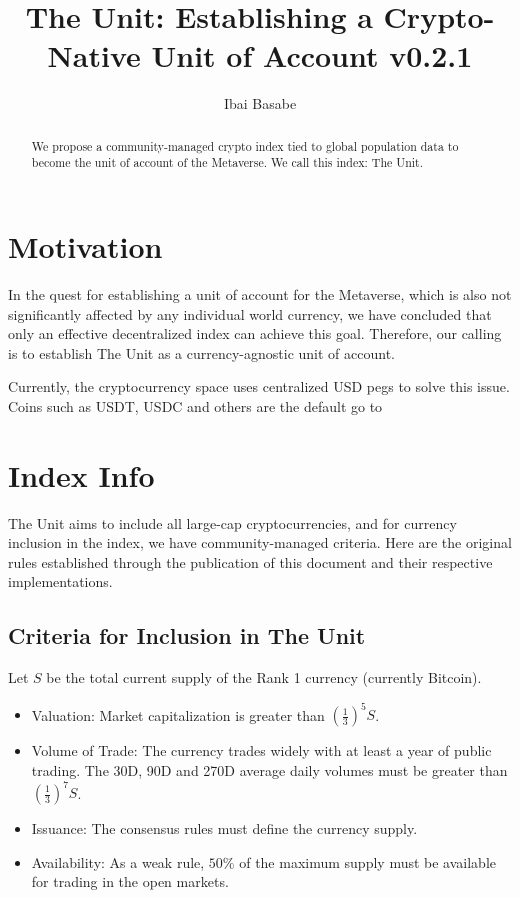 \documentclass[12pt]{article}
\title{The Unit: Establishing a Crypto-Native Unit of Account v0.2.1}
\author{Ibai Basabe}
\begin{document}
\pagecolor{yellow!15!}

\date{}

\maketitle


\begin{abstract}
We propose a community-managed crypto index tied to global population data to become the unit of account of the Metaverse. We call this index: The Unit. 
\end{abstract}


\tableofcontents
\newpage

\section{Motivation}

In the quest for establishing a unit of account for the Metaverse, which is also not significantly affected by any individual world currency, we have concluded that only an effective decentralized index can achieve this goal. Therefore, our calling is to establish The Unit as a currency-agnostic unit of account. 

Currently, the cryptocurrency space uses centralized USD pegs to solve this issue. Coins such as USDT, USDC and others are the default go to  

\section{Index Info}

The Unit aims to include all large-cap cryptocurrencies, and for currency inclusion in the index, we have community-managed criteria. Here are the original rules established through the publication of this document and their respective implementations.

\subsection{Criteria for Inclusion in The Unit}

Let $S$ be the total current supply of the Rank 1 currency (currently Bitcoin).

\begin{itemize}

\item Valuation: Market capitalization is greater than $\left(\frac{1}{3}\right)^5 S$.
\item Volume of Trade: The currency trades widely with at least a year of public trading. The 30D, 90D and 270D average daily volumes must be greater than $\left(\frac{1}{3}\right)^7 S$.
\item Issuance: The consensus rules must define the currency supply.
\item Availability: As a weak rule, $50\%$ of the maximum supply must be available for trading in the open markets.

\end{itemize}
\end{document}
